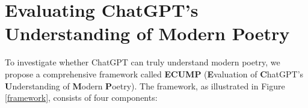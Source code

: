 \documentclass[11pt]{article}
\begin{document}













\section{Evaluating ChatGPT’s Understanding of Modern Poetry}
\label{Evaluating ChatGPT’s Understanding of Modern Poetry}

To investigate whether ChatGPT can truly understand modern poetry, we propose a comprehensive framework called \textbf{ECUMP} (\textbf{E}valuation of \textbf{C}hatGPT’s \textbf{U}nderstanding of \textbf{M}odern \textbf{P}oetry). The framework, as illustrated in Figure \ref{framework}, consists of four components:
\end{document}
